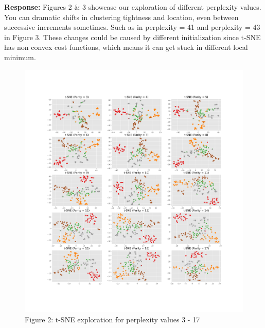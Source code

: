 \documentclass[12pt,article]{article}
\begin{document}
\textbf{Response:}\newline
Figures 2 \& 3 showcase our exploration of different perplexity values. You can dramatic shifts in clustering tightness and location, even between successive increments sometimes. Such as in perplexity = 41 and perplexity = 43 in Figure 3. These changes could be caused by different initialization since t-SNE has non convex cost functions, which means it can get stuck in different local minimum. \newline
\newpage
\begin{figure}[H]
\centering
\includegraphics[scale = 0.37]{images/sne_exploration1.png}    
\captionsetup{labelformat=empty}
\vspace{-65pt}
\caption{\scriptsize{Figure 2: t-SNE exploration for perplexity values 3 - 17}}
\end{figure}

\newpage
\end{document}
